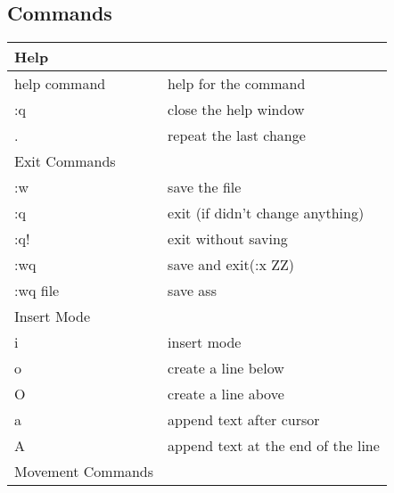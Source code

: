 \documentclass{book}
\begin{document}
		\subsection{Commands}
		\begin{longtable}{ll}
			\hline
			Help                                        &                                                   \\ \hline
			help command                                & help for the command                              \\
			:q                                          & close the help window                             \\
			.                                           & repeat the last change                            \\ \hline
			Exit Commands                               &                                                   \\ \hline
			:w                                          & save the file                                     \\
			:q                                          & exit (if didn't change anything)                  \\
			:q!                                         & exit without saving                               \\
			:wq                                         & save and exit(:x ZZ)                              \\
			:wq file                                    & save ass                                          \\ \hline
			Insert Mode                                 &                                                   \\ \hline
			i                                           & insert mode                                       \\
			o                                           & create a line below                               \\
			O                                           & create a line above                               \\
			a                                           & append text after cursor                          \\
			A                                           & append text at the end of the line                \\ \hline
			Movement Commands                           &                                                   \\ \hline

\end{longtable}
\end{document}
